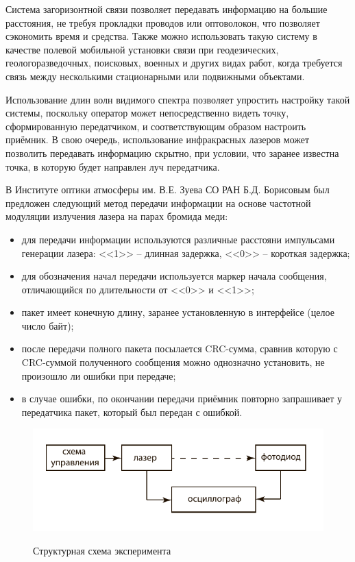 \documentclass[14pt,pscyr,titlepage]{hedreport}
\begin{document}
		Система загоризонтной связи позволяет передавать информацию на 
		большие расстояния, не требуя прокладки проводов или оптоволокон, 
		что позволяет сэкономить время и средства. Также можно использовать 
		такую систему в качестве полевой мобильной установки связи при 
		геодезических, геологоразведочных, поисковых, военных и других 
		видах работ, когда требуется связь между несколькими стационарными 
		или подвижными объектами.

		Использование длин волн видимого спектра позволяет упростить настройку 
		такой системы, поскольку оператор может непосредственно видеть 
		точку, сформированную передатчиком, и соответствующим образом 
		настроить приёмник. В свою очередь, использование инфракрасных 
		лазеров может позволить передавать информацию скрытно, при условии, 
		что заранее известна точка, в которую будет направлен луч передатчика.

		В Институте оптики атмосферы им. В.Е. Зуева СО РАН Б.Д. Борисовым был 
		предложен следующий метод передачи информации на основе частотной 
		модуляции излучения лазера на парах бромида меди:
		\begin{itemize}\itemsep-2pt
			\item для передачи информации используются различные расстояни 
				импульсами генерации лазера: <<1>> -- длинная задержка, 
				<<0>> -- короткая задержка;
			\item для обозначения начал передачи используется маркер 
				начала сообщения, отличающийся по длительности от <<0>> и 
				<<1>>;
			\item пакет имеет конечную длину, заранее установленную в 
				интерфейсе (целое число байт);
			\item после передачи полного пакета посылается CRC-сумма, сравнив 
				которую с CRC-суммой полученного сообщения можно однозначно 
				установить, не произошло ли ошибки при передаче;
			\item в случае ошибки, по окончании передачи приёмник повторно 
				запрашивает у передатчика пакет, который был передан с ошибкой.
		\end{itemize}

		\begin{figure}[!ht]
			\center
			\includegraphics[width=.8\textwidth]{experiment} \\
			\caption{Структурная схема эксперимента}
			\label{img:fiber01}
		\end{figure}
\end{document}
